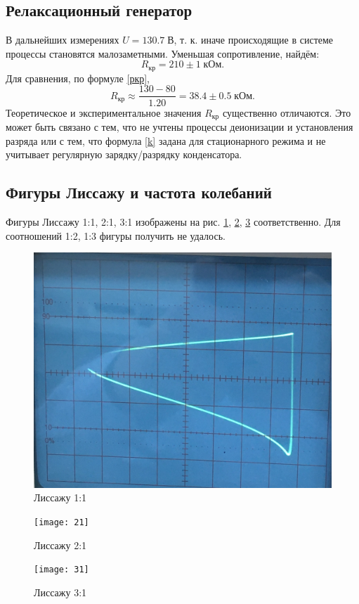 \documentclass[a4paper]{article}
\begin{document}
\subsection{Релаксационный генератор}
В дальнейших измерениях $ U = 130.7\; В $, т. к. иначе происходящие в системе процессы становятся малозаметными.
Уменьшая сопротивление, найдём:
\begin{equation*}\label{key}
	R_{кр} = 210 \pm 1 \; кОм.
\end{equation*}
Для сравнения, по формуле \eqref{ркр}, 
\begin{equation*}\label{key}
	R_{кр} \approx \frac{130-80}{1.20} = 38.4 \pm 0.5 \; кОм.
\end{equation*}
Теоретическое и экспериментальное значения $ R_{кр} $ существенно отличаются. Это может быть связано  с тем, что не учтены процессы деионизации и установления разряда или с тем, что формула \eqref{k} задана для стационарного режима и не учитывает регулярную зарядку/разрядку конденсатора.

\subsection{Фигуры Лиссажу и частота колебаний}

Фигуры Лиссажу 1:1, 2:1, 3:1 изображены на рис. \ref{fig:11}, \ref{fig:12}, \ref{fig:31} соответственно. Для соотношений 1:2, 1:3 фигуры получить не удалось. 
\begin{figure}[tbp]
	\centering
	\includegraphics[width=0.5\linewidth]{Осциллограмма}
	\caption{Лиссажу 1:1}
	\label{fig:11}
\end{figure}
\begin{figure}[tbp]
	\centering
	\texttt{[image: 21]}
	\caption{Лиссажу 2:1}
	\label{fig:12}
\end{figure}
\begin{figure}[tpb]
	\centering
	\texttt{[image: 31]}
	\caption{Лиссажу 3:1}
	\label{fig:31}
\end{figure}
\end{document}
